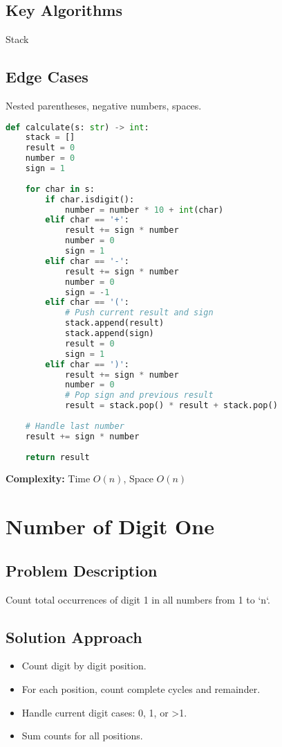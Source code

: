 \documentclass[10pt, a4paper]{article}
\begin{document}
\subsection*{Key Algorithms}
Stack

\subsection*{Edge Cases}
Nested parentheses, negative numbers, spaces.

\begin{lstlisting}[language=Python]
def calculate(s: str) -> int:
    stack = []
    result = 0
    number = 0
    sign = 1
    
    for char in s:
        if char.isdigit():
            number = number * 10 + int(char)
        elif char == '+':
            result += sign * number
            number = 0
            sign = 1
        elif char == '-':
            result += sign * number
            number = 0
            sign = -1
        elif char == '(':
            # Push current result and sign
            stack.append(result)
            stack.append(sign)
            result = 0
            sign = 1
        elif char == ')':
            result += sign * number
            number = 0
            # Pop sign and previous result
            result = stack.pop() * result + stack.pop()
    
    # Handle last number
    result += sign * number
    
    return result
\end{lstlisting}
\textbf{Complexity:} Time $O(n)$, Space $O(n)$

\section{Number of Digit One}
\subsection*{Problem Description}
Count total occurrences of digit 1 in all numbers from 1 to `n`.

\subsection*{Solution Approach}
\begin{itemize}
    \item Count digit by digit position.
    \item For each position, count complete cycles and remainder.
    \item Handle current digit cases: 0, 1, or >1.
    \item Sum counts for all positions.
\end{itemize}
\end{document}
